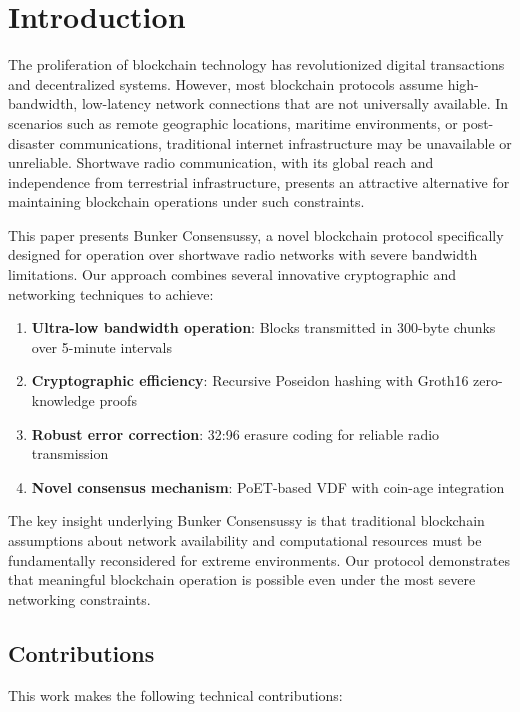 \documentclass[11pt,a4paper]{article}
\begin{document}
\section{Introduction}

The proliferation of blockchain technology has revolutionized digital transactions and decentralized systems. However, most blockchain protocols assume high-bandwidth, low-latency network connections that are not universally available. In scenarios such as remote geographic locations, maritime environments, or post-disaster communications, traditional internet infrastructure may be unavailable or unreliable. Shortwave radio communication, with its global reach and independence from terrestrial infrastructure, presents an attractive alternative for maintaining blockchain operations under such constraints.

This paper presents Bunker Consensussy, a novel blockchain protocol specifically designed for operation over shortwave radio networks with severe bandwidth limitations. Our approach combines several innovative cryptographic and networking techniques to achieve:

\begin{enumerate}
\item \textbf{Ultra-low bandwidth operation}: Blocks transmitted in 300-byte chunks over 5-minute intervals
\item \textbf{Cryptographic efficiency}: Recursive Poseidon hashing with Groth16 zero-knowledge proofs
\item \textbf{Robust error correction}: 32:96 erasure coding for reliable radio transmission
\item \textbf{Novel consensus mechanism}: PoET-based VDF with coin-age integration
\end{enumerate}

The key insight underlying Bunker Consensussy is that traditional blockchain assumptions about network availability and computational resources must be fundamentally reconsidered for extreme environments. Our protocol demonstrates that meaningful blockchain operation is possible even under the most severe networking constraints.

\subsection{Contributions}

This work makes the following technical contributions:
\end{document}
